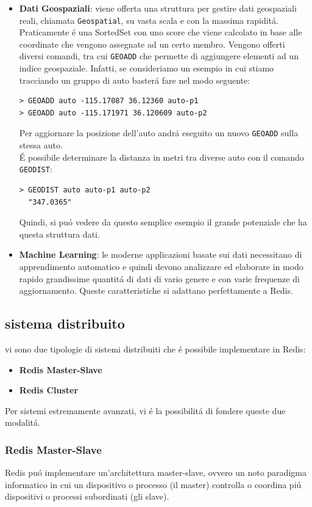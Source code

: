 \begin{itemize}
    \item \textbf{Dati Geospaziali}: viene offerta una struttura per gestire dati geospaziali reali, chiamata \texttt{Geospatial},
    su vasta scala e con la massima rapiditá. Praticamente é una SortedSet con uno score che viene calcolato in base alle coordinate che vengono assegnate ad un certo membro.
    Vengono offerti diversi comandi, tra cui \texttt{GEOADD} che permette di aggiungere elementi ad un indice geospaziale.
    Infatti, se consideriamo un esempio in cui stiamo tracciando un gruppo di auto basterá fare nel modo seguente:
    \begin{lstlisting}[autogobble]
> GEOADD auto -115.17087 36.12360 auto-p1
> GEOADD auto -115.171971 36.120609 auto-p2\end{lstlisting}
    Per aggiornare la posizione dell'auto andrá eseguito un nuovo \texttt{GEOADD} sulla stessa auto.\\
    É possibile determinare la distanza in metri tra diverse auto con il comando \texttt{GEODIST}:
    \begin{lstlisting}[autogobble]
> GEODIST auto auto-p1 auto-p2
  "347.0365"\end{lstlisting}
    Quindi, si puó vedere da questo semplice esempio il grande potenziale che ha questa struttura dati.
    \item \textbf{Machine Learning}: le moderne applicazioni basate sui dati necessitano di apprendimento automatico e quindi devono analizzare
    ed elaborare in modo rapido grandissime quantitá di dati di vario genere e con varie frequenze di aggiornamento. Queste caratteristiche
    si adattano perfettamente a Redis.
\end{itemize}

\subsection{sistema distribuito}
vi sono due tipologie di sistemi distribuiti che é possibile implementare in Redis:
\begin{itemize}
    \item \textbf{Redis Master-Slave}
    \item \textbf{Redis Cluster}
\end{itemize}
Per sistemi estremamente avanzati, vi é la possibilitá di fondere queste due modalitá.
\subsubsection{Redis Master-Slave}
Redis puó implementare un'architettura master-slave, ovvero un noto paradigma informatico in cui un dispositivo o processo (il master)
controlla o coordina piú dispositivi o processi subordinati (gli slave).

